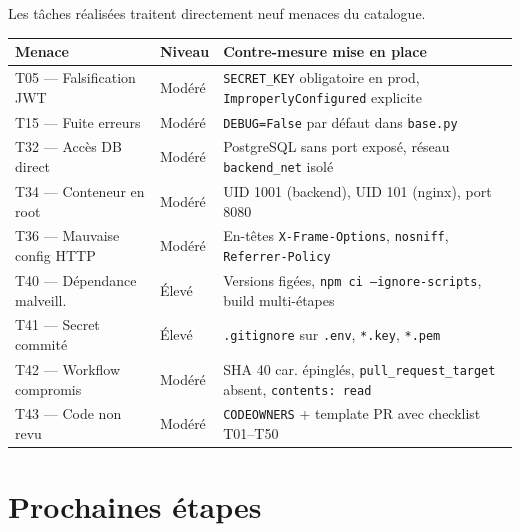 \documentclass[11pt,a4paper]{article}
\begin{document}
Les tâches réalisées traitent directement neuf menaces du catalogue.

\begin{center}
\renewcommand{\arraystretch}{1.3}
\begin{tabular}{llp{7.5cm}}
  \toprule
  \textbf{Menace} & \textbf{Niveau} & \textbf{Contre-mesure mise en place} \\
  \midrule
  T05 --- Falsification JWT    & Modéré   &
    \texttt{SECRET\_KEY} obligatoire en prod, \texttt{ImproperlyConfigured} explicite \\
  T15 --- Fuite erreurs        & Modéré   &
    \texttt{DEBUG=False} par défaut dans \texttt{base.py} \\
  T32 --- Accès DB direct      & Modéré   &
    PostgreSQL sans port exposé, réseau \texttt{backend\_net} isolé \\
  T34 --- Conteneur en root    & Modéré   &
    UID 1001 (backend), UID 101 (nginx), port 8080 \\
  T36 --- Mauvaise config HTTP & Modéré   &
    En-têtes \texttt{X-Frame-Options}, \texttt{nosniff}, \texttt{Referrer-Policy} \\
  T40 --- Dépendance malveill. & Élevé    &
    Versions figées, \texttt{npm ci --ignore-scripts}, build multi-étapes \\
  T41 --- Secret commité       & Élevé    &
    \texttt{.gitignore} sur \texttt{.env}, \texttt{*.key}, \texttt{*.pem} \\
  T42 --- Workflow compromis   & Modéré   &
    SHA 40 car. épinglés, \texttt{pull\_request\_target} absent, \texttt{contents: read} \\
  T43 --- Code non revu        & Modéré   &
    \texttt{CODEOWNERS} + template PR avec checklist T01--T50 \\
  \bottomrule
\end{tabular}
\end{center}

\section{Prochaines étapes}
\end{document}
